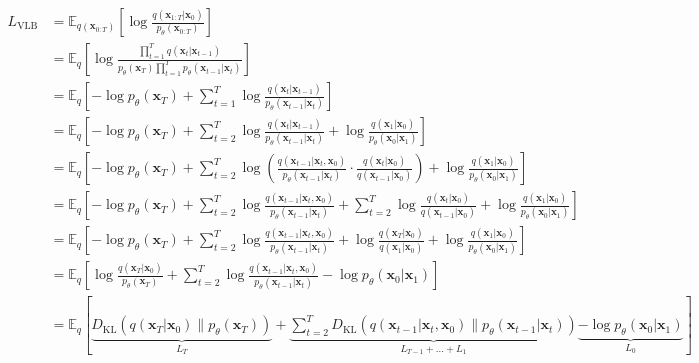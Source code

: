 \documentclass[zihao=-4, fontset=windows]{ctexart}
\begin{document}
\begin{equation}
\begin{aligned}
L_{\text{VLB}} & = \mathbb{E}_{q(\mathbf{x}_{0: T})}\left[\log \frac{q(\mathbf{x}_{1: T} | \mathbf{x}_{0})}{p_{\theta}(\mathbf{x}_{0: T})}\right] \\
& = \mathbb{E}_{q}\left[ \log \frac{\prod_{t=1}^{T} q(\mathbf{x}_{t} | \mathbf{x}_{t-1})}{p_{\theta}(\mathbf{x}_{T}) \prod_{t=1}^{T} p_{\theta}(\mathbf{x}_{t-1} | \mathbf{x}_{t})} \right] \\
& = \mathbb{E}_{q}\left[ -\log p_{\theta}(\mathbf{x}_{T}) + \sum_{t=1}^{T} \log \frac{q(\mathbf{x}_{t} | \mathbf{x}_{t-1})}{p_{\theta}(\mathbf{x}_{t-1} | \mathbf{x}_{t})} \right] \\
& = \mathbb{E}_{q}\left[ -\log p_{\theta}(\mathbf{x}_{T}) + \sum_{t=2}^{T} \log \frac{q(\mathbf{x}_{t} | \mathbf{x}_{t-1})}{p_{\theta}(\mathbf{x}_{t-1} | \mathbf{x}_{t})} + \log \frac{q(\mathbf{x}_{1} | \mathbf{x}_{0})}{p_{\theta}(\mathbf{x}_{0} | \mathbf{x}_{1})} \right] \\
& = \mathbb{E}_{q}\left[ -\log p_{\theta}(\mathbf{x}_{T}) + \sum_{t=2}^{T} \log \left( \frac{q(\mathbf{x}_{t-1} | \mathbf{x}_{t}, \mathbf{x}_{0})}{p_{\theta}(\mathbf{x}_{t-1} | \mathbf{x}_{t})} \cdot \frac{q(\mathbf{x}_{t} | \mathbf{x}_{0})}{q(\mathbf{x}_{t-1} | \mathbf{x}_{0})} \right) + \log \frac{q(\mathbf{x}_{1} | \mathbf{x}_{0})}{p_{\theta}(\mathbf{x}_{0} | \mathbf{x}_{1})} \right] \\
& = \mathbb{E}_{q}\left[ -\log p_{\theta}(\mathbf{x}_{T}) + \sum_{t=2}^{T} \log \frac{q(\mathbf{x}_{t-1} | \mathbf{x}_{t}, \mathbf{x}_{0})}{p_{\theta}(\mathbf{x}_{t-1} | \mathbf{x}_{t})} + \sum_{t=2}^{T} \log \frac{q(\mathbf{x}_{t} | \mathbf{x}_{0})}{q(\mathbf{x}_{t-1} | \mathbf{x}_{0})} + \log \frac{q(\mathbf{x}_{1} | \mathbf{x}_{0})}{p_{\theta}(\mathbf{x}_{0} | \mathbf{x}_{1})} \right] \\
& = \mathbb{E}_{q}\left[ -\log p_{\theta}(\mathbf{x}_{T}) + \sum_{t=2}^{T} \log \frac{q(\mathbf{x}_{t-1} | \mathbf{x}_{t}, \mathbf{x}_{0})}{p_{\theta}(\mathbf{x}_{t-1} | \mathbf{x}_{t})} + \log \frac{q(\mathbf{x}_{T} | \mathbf{x}_{0})}{q(\mathbf{x}_{1} | \mathbf{x}_{0})} + \log \frac{q(\mathbf{x}_{1} | \mathbf{x}_{0})}{p_{\theta}(\mathbf{x}_{0} | \mathbf{x}_{1})} \right] \\
& = \mathbb{E}_{q}\left[ \log \frac{q(\mathbf{x}_{T} | \mathbf{x}_{0})}{p_{\theta}(\mathbf{x}_{T})} + \sum_{t=2}^{T} \log \frac{q(\mathbf{x}_{t-1} | \mathbf{x}_{t}, \mathbf{x}_{0})}{p_{\theta}(\mathbf{x}_{t-1} | \mathbf{x}_{t})} - \log p_{\theta}(\mathbf{x}_{0} | \mathbf{x}_{1}) \right] \\
& = \mathbb{E}_{q}\left[ \underbrace{D_{\text{KL}}(q(\mathbf{x}_{T} | \mathbf{x}_{0}) \| p_{\theta}(\mathbf{x}_{T}))}_{L_T} + \underbrace{\sum_{t=2}^{T} D_{\text{KL}}( q(\mathbf{x}_{t-1} | \mathbf{x}_{t}, \mathbf{x}_{0}) \| p_{\theta}(\mathbf{x}_{t-1} | \mathbf{x}_{t}) )}_{L_{T-1}+\dots+L_1} \underbrace{- \log p_{\theta}(\mathbf{x}_{0} | \mathbf{x}_{1})}_{L_0} \right]
\end{aligned}
\end{equation}
\end{document}
